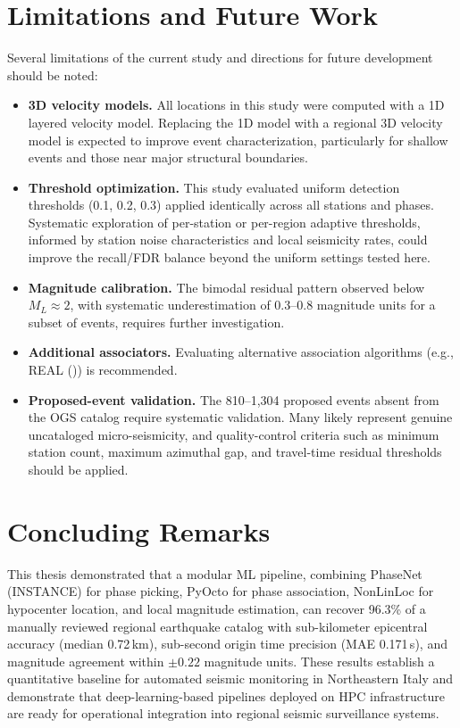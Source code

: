 \section{Limitations and Future Work}
Several limitations of the current study and directions for future development
should be noted:
\begin{itemize}
  \item \textbf{3D velocity models.} All locations in this study were computed
    with a 1D layered velocity model. Replacing the 1D model with a
    regional 3D velocity model is
    expected to improve event characterization,
    particularly for shallow events and those near major structural boundaries.

  \item \textbf{Threshold optimization.} This study evaluated uniform detection
    thresholds (0.1, 0.2, 0.3) applied identically across all stations and
    phases. Systematic exploration of per-station or per-region adaptive
    thresholds, informed by station noise characteristics and local seismicity
    rates, could improve the recall/\ac{FDR} balance beyond the uniform
    settings tested here.

  \item \textbf{Magnitude calibration.} The bimodal residual pattern observed
    below $M_L \approx 2$, with systematic underestimation of
    0.3--0.8 magnitude
    units for a subset of events, requires further investigation.

  \item \textbf{Additional associators.} Evaluating alternative association
    algorithms (e.g., REAL (\cite{REAL})) is recommended.

  \item \textbf{Proposed-event validation.} The 810--1,304 proposed events
    absent from the OGS catalog require systematic validation. Many likely
    represent genuine uncataloged micro-seismicity, and
    quality-control criteria
    such as minimum station count, maximum azimuthal gap, and travel-time
    residual thresholds should be applied.
\end{itemize}

\section{Concluding Remarks}
This thesis demonstrated that a modular ML pipeline, combining PhaseNet
(INSTANCE) for phase picking, PyOcto for phase association, NonLinLoc for
hypocenter location, and local magnitude estimation, can recover 96.3\% of a
manually reviewed regional earthquake catalog with sub-kilometer epicentral
accuracy (median 0.72\,km), sub-second origin time precision (MAE 0.171\,s),
and magnitude agreement within $\pm 0.22$ magnitude units. These results
establish a quantitative baseline for automated seismic monitoring in
Northeastern Italy and demonstrate that deep-learning-based pipelines deployed
on HPC infrastructure are ready for operational integration into regional
seismic surveillance systems.